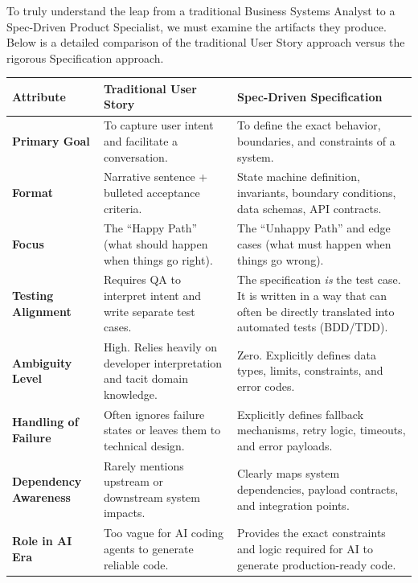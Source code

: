 To truly understand the leap from a traditional Business Systems Analyst
to a Spec-Driven Product Specialist, we must examine the artifacts they
produce. Below is a detailed comparison of the traditional User Story
approach versus the rigorous Specification approach.

\begin{longtable}[]{@{}
  >{\raggedright\arraybackslash}p{}
  >{\raggedright\arraybackslash}p{}
  >{\raggedright\arraybackslash}p{}@{}}
\toprule\noalign{}
\begin{minipage}[b]{\linewidth}\raggedright
Attribute
\end{minipage} & \begin{minipage}[b]{\linewidth}\raggedright
Traditional User Story
\end{minipage} & \begin{minipage}[b]{\linewidth}\raggedright
Spec-Driven Specification
\end{minipage} \\
\midrule\noalign{}
\endhead
\bottomrule\noalign{}
\endlastfoot
\textbf{Primary Goal} & To capture user intent and facilitate a
conversation. & To define the exact behavior, boundaries, and
constraints of a system. \\
\textbf{Format} & Narrative sentence + bulleted acceptance criteria. &
State machine definition, invariants, boundary conditions, data schemas,
API contracts. \\
\textbf{Focus} & The ``Happy Path'' (what should happen when things go
right). & The ``Unhappy Path'' and edge cases (what must happen when
things go wrong). \\
\textbf{Testing Alignment} & Requires QA to interpret intent and write
separate test cases. & The specification \emph{is} the test case. It is
written in a way that can often be directly translated into automated
tests (BDD/TDD). \\
\textbf{Ambiguity Level} & High. Relies heavily on developer
interpretation and tacit domain knowledge. & Zero. Explicitly defines
data types, limits, constraints, and error codes. \\
\textbf{Handling of Failure} & Often ignores failure states or leaves
them to technical design. & Explicitly defines fallback mechanisms,
retry logic, timeouts, and error payloads. \\
\textbf{Dependency Awareness} & Rarely mentions upstream or downstream
system impacts. & Clearly maps system dependencies, payload contracts,
and integration points. \\
\textbf{Role in AI Era} & Too vague for AI coding agents to generate
reliable code. & Provides the exact constraints and logic required for
AI to generate production-ready code. \\
\end{longtable}

